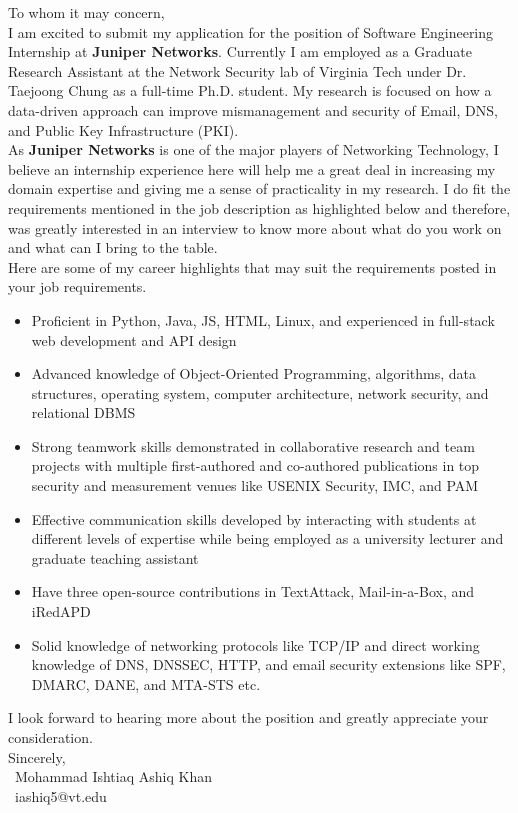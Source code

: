 \documentclass{article}
\begin{document}
To whom it may concern,\\

I am excited to submit my application for the position of Software Engineering Internship at \textbf{Juniper Networks}.
Currently I am employed as a Graduate Research Assistant at the Network Security lab of Virginia Tech under Dr.
Taejoong Chung as a full-time Ph.D. student. My research is focused on how a data-driven approach can improve
mismanagement and security of Email, DNS, and Public Key Infrastructure (PKI).\\


As \textbf{Juniper Networks} is one of the major players of Networking Technology, I believe an internship
experience here will help me a great deal in increasing my domain expertise and giving me a sense of practicality
in my research. I do fit the requirements mentioned in the job description as highlighted below and therefore,
was greatly interested in an interview to know more about what do you work on and what can I bring to the table.\\

Here are some of my career highlights that may suit the requirements posted in your job requirements.\\

\begin{itemize}
    \item Proficient in Python, Java, JS, HTML, Linux, and experienced in full-stack web development and
    API design
    \item Advanced knowledge of Object-Oriented Programming, algorithms, data structures, operating system,
    computer architecture, network security, and relational DBMS
    \item Strong teamwork skills demonstrated in collaborative research and team projects with multiple
    first-authored and co-authored publications in top security and measurement venues like USENIX Security,
    IMC, and PAM
    \item Effective communication skills developed by interacting with students at different levels of expertise
    while being employed as a university lecturer and graduate teaching assistant
    \item Have three open-source contributions in TextAttack, Mail-in-a-Box, and iRedAPD
    \item Solid knowledge of networking protocols like TCP/IP and direct working knowledge of DNS, DNSSEC, HTTP,
    and email security extensions like SPF, DMARC, DANE, and MTA-STS etc.
\end{itemize}

I look forward to hearing more about the position and greatly appreciate your consideration.\\


Sincerely,\\
~Mohammad Ishtiaq Ashiq Khan\\
~iashiq5@vt.edu\\
\end{document}
